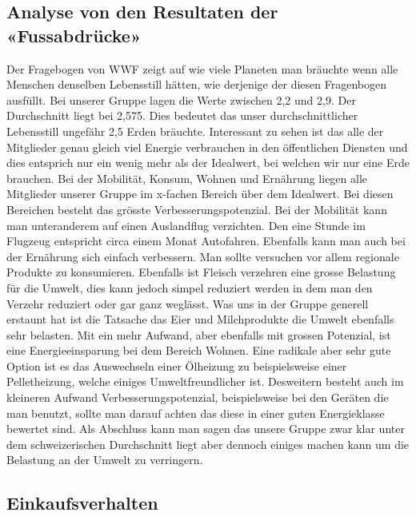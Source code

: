 \subsection{Analyse von den Resultaten der «Fussabdrücke»}
Der Fragebogen von WWF zeigt auf wie viele Planeten man bräuchte wenn alle Menschen denselben Lebensstill hätten, wie derjenige der diesen Fragenbogen ausfüllt. Bei unserer Gruppe lagen die Werte zwischen 2,2 und 2,9. Der Durchschnitt liegt bei 2,575. Dies bedeutet das unser durchschnittlicher Lebensstill ungefähr 2,5 Erden bräuchte.
Interessant zu sehen ist das alle der Mitglieder genau gleich viel Energie verbrauchen in den öffentlichen Diensten und dies entsprich nur ein wenig mehr als der Idealwert, bei welchen wir nur eine Erde brauchen. Bei der Mobilität, Konsum, Wohnen und Ernährung liegen alle Mitglieder unserer Gruppe im x-fachen Bereich über dem Idealwert. Bei diesen Bereichen besteht das grösste Verbesserungspotenzial. Bei der Mobilität kann man unteranderem auf einen Auslandflug verzichten. Den eine Stunde im Flugzeug entspricht circa einem Monat Autofahren. 
Ebenfalls kann man auch bei der Ernährung sich einfach verbessern. Man sollte versuchen vor allem regionale Produkte zu konsumieren. Ebenfalls ist Fleisch verzehren eine grosse Belastung für die Umwelt, dies kann jedoch simpel reduziert werden in dem man den Verzehr reduziert oder gar ganz weglässt. Was uns in der Gruppe generell erstaunt hat ist die Tatsache das Eier und Milchprodukte die Umwelt ebenfalls sehr belasten. 
Mit ein mehr Aufwand, aber ebenfalls mit grossen Potenzial, ist eine Energieeinsparung bei dem Bereich Wohnen. Eine radikale aber sehr gute Option ist es das Auswechseln einer Ölheizung zu beispielsweise einer Pelletheizung, welche einiges Umweltfreundlicher ist. Desweitern besteht auch im kleineren Aufwand Verbesserungspotenzial, beispielsweise bei den Geräten die man benutzt, sollte man darauf achten das diese in einer guten Energieklasse bewertet sind. 
Als Abschluss kann man sagen das unsere Gruppe zwar klar unter dem schweizerischen Durchschnitt liegt aber dennoch einiges machen kann um die Belastung an der Umwelt zu verringern. 

\subsection{Einkaufsverhalten}

